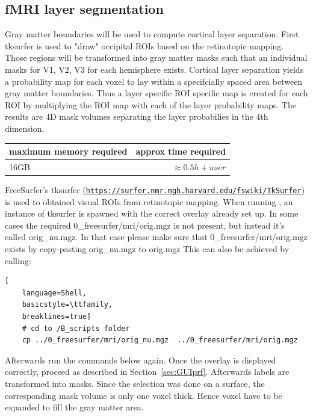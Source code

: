 \documentclass[12pt,a4paper]{scrartcl}
\begin{document}
\subsection{fMRI layer segmentation}
Gray matter boundaries will be used to compute cortical layer separation. First tksurfer is used to "draw" occipital ROIs based on the retinotopic mapping. Those regions will be transformed into gray matter masks such that an individual masks for V1, V2, V3 for each hemisphere exists. Cortical layer separation yields a probability map for each voxel to lay within a specifcially spaced area between gray matter boundaries. Thus a layer specific ROI specific map is created for each ROI by multiplying the ROI map with each of the layer probability maps. The results are 4D mask volumes separating the layer probabilies in the 4th dimension.
\begin{table}[h]
\begin{tabular}{l | r}
\toprule
maximum memory required & approx time required\\\toprule
16GB & $\approx 0.5h+user$ \\\bottomrule
\end{tabular}
\end{table}
\FloatBarrier
FreeSurfer's tksurfer (\href{https://surfer.nmr.mgh.harvard.edu/fswiki/TkSurfer}{\nolinkurl{https://surfer.nmr.mgh.harvard.edu/fswiki/TkSurfer}}) is used to obtained visual ROIs from retinotopic mapping. When running \texttt{}, an instance of tksurfer is spawned with the correct overlay already set up. In some cases the required 0\_freesurfer/mri/orig.mgz is not present, but instead it's called orig\_nu.mgz. In that case please make sure that 0\_freesurfer/mri/orig.mgz exists by copy-pasting orig\_nu.mgz to orig.mgz This can also be achieved by calling:\\
\begin{lstlisting}[
    language=Shell,
    basicstyle=\ttfamily,
    breaklines=true]
    # cd to /B_scripts folder
    cp ../0_freesurfer/mri/orig_nu.mgz  ../0_freesurfer/mri/orig.mgz
\end{lstlisting}
Afterwards run the commands below again. Once the overlay is displayed correctly, proceed as described in Section~\ref{sec:GUIprf}. Afterwards labels are transformed into masks. Since the selection was done on a surface, the corresponding mask volume is only one voxel thick. Hence voxel have to be expanded to fill the gray matter area.\\
\end{document}
